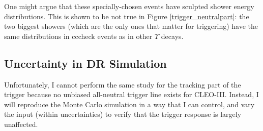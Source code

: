 One might argue that these specially-chosen events have sculpted
shower energy distributions.  This is shown to be not true in Figure
\ref{trigger_neutralpart}: the two biggest showers (which are the only
ones that matter for triggering) have the same distributions in
cccheck events as in other $\Upsilon$ decays.

\subsection{Uncertainty in DR Simulation}

Unfortunately, I cannot perform the same study for the tracking part
of the trigger because no unbiased all-neutral trigger line exists for
CLEO-III.  Instead, I will reproduce the Monte Carlo simulation in a
way that I can control, and vary the input (within uncertainties) to
verify that the trigger response is largely unaffected.

